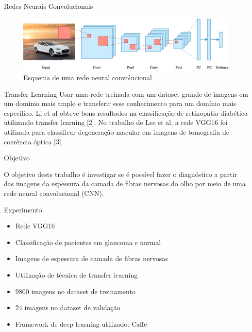 \documentclass{beamer}
\begin{document}
\begin{frame}{Redes Neurais Convolucionais}

    \begin{figure}
        \includegraphics[width=\linewidth]{img/convolucao.png} 
        \caption{Esquema de uma rede neural convolucional}
    \end{figure}
    
\end{frame}

\begin{frame}{Transfer Learning}
    Usar uma rede treinada com um dataset grande de imagens em  um  domínio  mais  amplo  e  transferir  esse  conhecimento para  um  domínio  mais  específico.
    Li et al obteve bons resultados na classificação de retinopatia diabética utilizando transfer learning [2]. No trabalho de Lee et al, a rede VGG16 foi utilizada para classificar degeneração macular em imagens de tomografia de coerência óptica [3].
    
\end{frame}

\begin{frame}{Objetivo}

    O objetivo deste trabalho é investigar se é possível fazer o diagnóstico a partir das imagens da espessura da camada de fibras nervosas do olho por meio de uma rede neural convolucional (CNN).
    
\end{frame}

\begin{frame}{Experimento}
    
    \begin{itemize}
        \item Rede VGG16
        \item Classificação de pacientes em glaucoma e normal
        \item Imagens de espessura de camada de fibras nervosas
        \item Utilização de técnica de transfer learning
        \item 9800 imagens no dataset de treinamento
        \item 24 imagens no dataset de validação
        \item Framework de deep learning utilizado: Caffe
    \end{itemize}
    
\end{frame}
\end{document}
